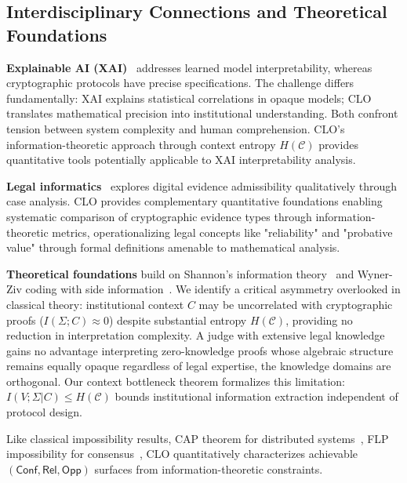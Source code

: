 \documentclass{ieeeaccess}
\begin{document}
\subsection{Interdisciplinary Connections and Theoretical Foundations}

\textbf{Explainable AI (XAI)}~\cite{Ribeiro16} addresses learned model interpretability, whereas cryptographic protocols have precise specifications. The challenge differs fundamentally: XAI explains statistical correlations in opaque models; CLO translates mathematical precision into institutional understanding. Both confront tension between system complexity and human comprehension. CLO's information-theoretic approach through context entropy $H(\mathcal{C})$ provides quantitative tools potentially applicable to XAI interpretability analysis.

\textbf{Legal informatics}~\cite{Kerr04,Casey11} explores digital evidence admissibility qualitatively through case analysis. CLO provides complementary quantitative foundations enabling systematic comparison of cryptographic evidence types through information-theoretic metrics, operationalizing legal concepts like "reliability" and "probative value" through formal definitions amenable to mathematical analysis.

\textbf{Theoretical foundations} build on Shannon's information theory~\cite{Shannon48} and Wyner-Ziv coding with side information~\cite{WynerZiv76}. We identify a critical asymmetry overlooked in classical theory: institutional context $C$ may be uncorrelated with cryptographic proofs ($I(\Sigma;C) \approx 0$) despite substantial entropy $H(\mathcal{C})$, providing no reduction in interpretation complexity. A judge with extensive legal knowledge gains no advantage interpreting zero-knowledge proofs whose algebraic structure remains equally opaque regardless of legal expertise, the knowledge domains are orthogonal. Our context bottleneck theorem formalizes this limitation: $I(V;\Sigma|C) \leq H(\mathcal{C})$ bounds institutional information extraction independent of protocol design.

Like classical impossibility results, CAP theorem for distributed systems~\cite{Brewer00}, FLP impossibility for consensus~\cite{FLP85}, CLO quantitatively characterizes achievable $(\mathsf{Conf},\mathsf{Rel},\mathsf{Opp})$ surfaces from information-theoretic constraints.
\end{document}
